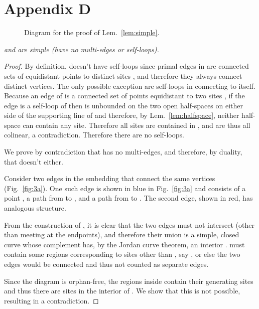 \documentclass[11pt]{article}
\begin{document}
\section*{Appendix D}\label{app:simple}

\begin{figure}[ht]
\centering
{}
\label{fig:subfigureExample}
\caption{Diagram for the proof of Lem.~\ref{lem:simple}.}
\end{figure}


\emph{
 and  are simple (have no multi-edges or self-loops).
}
\begin{proof}



By definition,  doesn't have self-loops since primal edges in  are connected sets of equidistant points to distinct sites , and
therefore they always connect distinct vertices. 
The only possible exception are self-loops in  connecting
 to itself. 
Because an edge of  is a connected set  of points
equidistant to two sites , if the edge is a self-loop of 
then  is unbounded on the two open half-spaces on either side of the
supporting line  of  and therefore, by Lem.~\ref{lem:halfspace},
neither half-space can contain any site. Therefore all sites are contained
in , and are thus all colinear, a contradiction. Therefore there are no
self-loops. 

We prove by contradiction that  has no multi-edges, 
and therefore, by duality, that  doesn't either. 

Consider two edges in the embedding  that connect the same vertices 
(Fig.~\ref{fig:3a}).
One such edge is shown in blue in Fig.~\ref{fig:3a} and consists of a point , 
a path  from  to , 
and a path  from  to .
The second edge, shown in red, has analogous structure. 

From the construction of , it is clear that the two edges must not intersect (other
than meeting at the endpoints), and therefore their union is a simple, closed
curve whose complement has, by the Jordan curve theorem, an interior . 
 must contain some regions corresponding to sites other than , say , 
or else the two edges would be connected and thus not counted as separate edges. 

Since the diagram is orphan-free, the regions inside  contain their
generating sites and thus there are sites  in the
interior of . 
We show that this is not possible, resulting in a contradiction. 



\end{proof}
\end{document}
